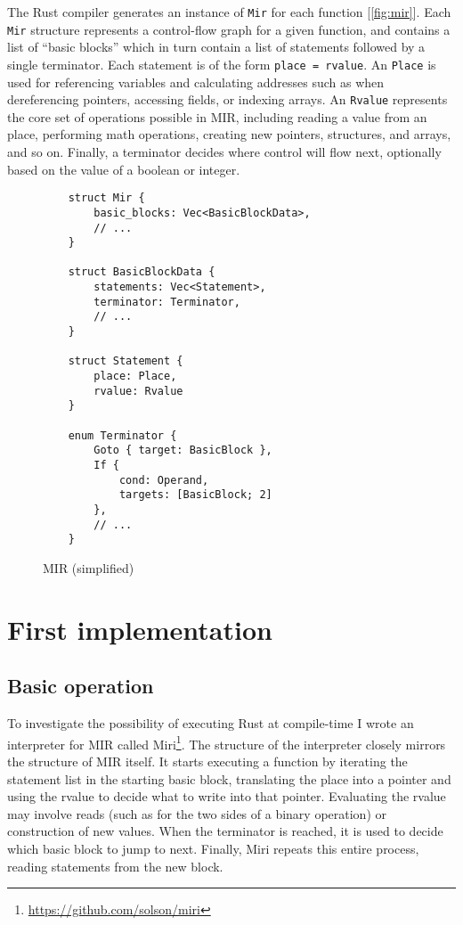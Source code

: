 \documentclass[twocolumn]{article}
\newcommand{\rust}[1]{\texttt{#1}}
\begin{document}
The Rust compiler generates an instance of \rust{Mir} for each function [\autoref{fig:mir}]. Each
\rust{Mir} structure represents a control-flow graph for a given function, and contains a list of
``basic blocks'' which in turn contain a list of statements followed by a single terminator. Each
statement is of the form \rust{place = rvalue}. An \rust{Place} is used for referencing variables
and calculating addresses such as when dereferencing pointers, accessing fields, or indexing arrays.
An \rust{Rvalue} represents the core set of operations possible in MIR, including reading a value
from an place, performing math operations, creating new pointers, structures, and arrays, and so
on. Finally, a terminator decides where control will flow next, optionally based on the value of a
boolean or integer.

\begin{figure}[ht]
  \begin{verbatim}
    struct Mir {
        basic_blocks: Vec<BasicBlockData>,
        // ...
    }

    struct BasicBlockData {
        statements: Vec<Statement>,
        terminator: Terminator,
        // ...
    }

    struct Statement {
        place: Place,
        rvalue: Rvalue
    }

    enum Terminator {
        Goto { target: BasicBlock },
        If {
            cond: Operand,
            targets: [BasicBlock; 2]
        },
        // ...
    }
  \end{verbatim}
  \caption{MIR (simplified)}
  \label{fig:mir}
\end{figure}


\section{First implementation}

\subsection{Basic operation}

To investigate the possibility of executing Rust at compile-time I wrote an interpreter for MIR
called Miri\footnote{\url{https://github.com/solson/miri}}. The structure of the interpreter closely
mirrors the structure of MIR itself. It starts executing a function by iterating the statement list
in the starting basic block, translating the place into a pointer and using the rvalue to decide
what to write into that pointer. Evaluating the rvalue may involve reads (such as for the two sides
of a binary operation) or construction of new values. When the terminator is reached, it is used to
decide which basic block to jump to next. Finally, Miri repeats this entire process, reading
statements from the new block.
\end{document}
